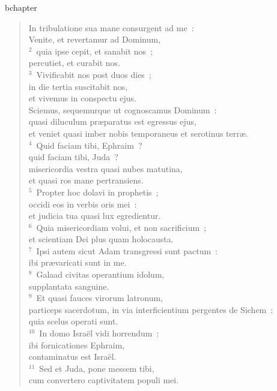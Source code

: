 bchapter\begin{verse}\vspace{-19pt}In tribulatione sua mane consurgent ad me~:\\ Venite, et revertamur ad Dominum,\\
${}^{2}$~quia ipse cepit, et sanabit nos~;\\ percutiet, et curabit nos.\\
${}^{3}$~Vivificabit nos post duos dies~;\\ in die tertia suscitabit nos,\\ et vivemus in conspectu ejus.\\ Sciemus, sequemurque ut cognoscamus Dominum~:\\ quasi diluculum pr\ae paratus est egressus ejus,\\ et veniet quasi imber nobis temporaneus et serotinus terr\ae .\\
${}^{4}$~Quid faciam tibi, Ephraim~?\\ quid faciam tibi, Juda~?\\ misericordia vestra quasi nubes matutina,\\ et quasi ros mane pertransiens.\\
${}^{5}$~Propter hoc dolavi in prophetis~;\\ occidi eos in verbis oris mei~:\\ et judicia tua quasi lux egredientur.\\
${}^{6}$~Quia misericordiam volui, et non sacrificium~;\\ et scientiam Dei plus quam holocausta.\\
${}^{7}$~Ipsi autem sicut Adam transgressi sunt pactum~:\\ ibi pr\ae varicati sunt in me.\\
${}^{8}$~Galaad civitas operantium idolum,\\ supplantata sanguine.\\
${}^{9}$~Et quasi fauces virorum latronum,\\ particeps sacerdotum, in via interficientium pergentes de Sichem~:\\ quia scelus operati sunt.\\
${}^{10}$~In domo Isra\"el vidi horrendum~:\\ ibi fornicationes Ephraim,\\ contaminatus est Isra\"el.\\
${}^{11}$~Sed et Juda, pone messem tibi,\\ cum convertero captivitatem populi mei.\end{verse}


